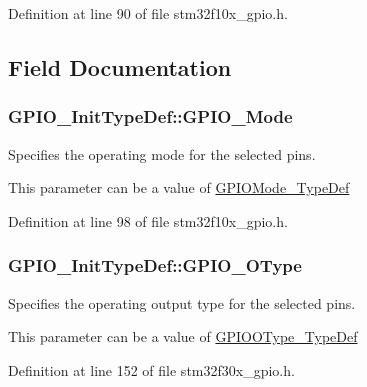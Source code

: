Definition at line 90 of file stm32f10x\-\_\-gpio.\-h.



\subsection{Field Documentation}
\hypertarget{struct_g_p_i_o___init_type_def_a55bd77e335c2bfeec9caa5dc922b791b}{
\subsubsection[{G\-P\-I\-O\-\_\-\-Mode}]{ G\-P\-I\-O\-\_\-\-Init\-Type\-Def\-::\-G\-P\-I\-O\-\_\-\-Mode}}\label{struct_g_p_i_o___init_type_def_a55bd77e335c2bfeec9caa5dc922b791b}
\begin{DoxyVerb}    Specifies the operating mode for the selected pins.
\end{DoxyVerb}
 This parameter can be a value of \hyperlink{stm32f10x__gpio_8h_a1347339e1c84a196fabbb31205eec5d4}{G\-P\-I\-O\-Mode\-\_\-\-Type\-Def} 

Definition at line 98 of file stm32f10x\-\_\-gpio.\-h.

\hypertarget{struct_g_p_i_o___init_type_def_af48c56f3e56e71204c8904ea29f5181b}{
\subsubsection[{G\-P\-I\-O\-\_\-\-O\-Type}]{ G\-P\-I\-O\-\_\-\-Init\-Type\-Def\-::\-G\-P\-I\-O\-\_\-\-O\-Type}}\label{struct_g_p_i_o___init_type_def_af48c56f3e56e71204c8904ea29f5181b}
\begin{DoxyVerb}   Specifies the operating output type for the selected pins.
\end{DoxyVerb}
 This parameter can be a value of \hyperlink{stm32f4xx__gpio_8h_ae74212e8d66c389f47326b06bdf6d2ab}{G\-P\-I\-O\-O\-Type\-\_\-\-Type\-Def} 

Definition at line 152 of file stm32f30x\-\_\-gpio.\-h.

